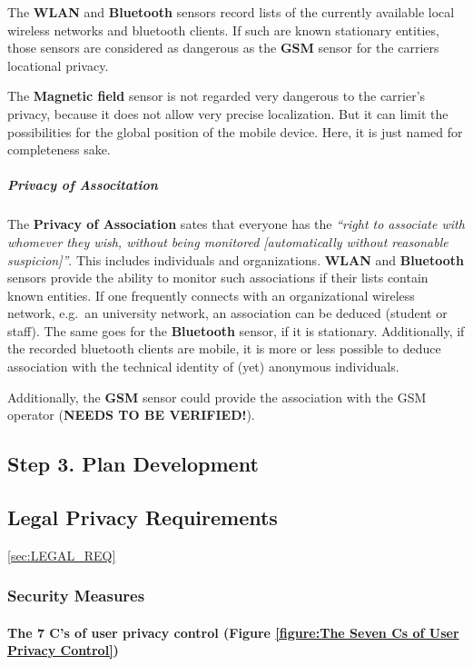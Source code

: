 The \textbf{WLAN} and \textbf{Bluetooth} sensors record lists of the
currently available local wireless networks and bluetooth clients. If
such are known stationary entities, those sensors are considered as
dangerous as the \textbf{GSM} sensor for the carriers locational
privacy.

The \textbf{Magnetic field} sensor is not regarded very dangerous to the
carrier's privacy, because it does not allow very precise localization.
But it can limit the possibilities for the global position of the mobile
device. Here, it is just named for completeness sake.

\subparagraph{Privacy of Associtation}

The \textbf{Privacy of Association} sates that everyone has the
\emph{``right to associate with whomever they wish, without being
monitored [automatically without reasonable suspicion]''}. This
includes individuals and organizations. \textbf{WLAN} and
\textbf{Bluetooth} sensors provide the ability to monitor such
associations if their lists contain known entities. If one frequently
connects with an organizational wireless network, e.g.~an university
network, an association can be deduced (student or staff). The same goes
for the \textbf{Bluetooth} sensor, if it is stationary. Additionally, if
the recorded bluetooth clients are mobile, it is more or less possible
to deduce association with the technical identity of (yet) anonymous
individuals.

Additionally, the \textbf{GSM} sensor could provide the association with
the GSM operator (\textbf{NEEDS TO BE VERIFIED!}).

\subsection{Step 3. Plan Development}

\subsection{Legal Privacy Requirements} \ref{sec:LEGAL_REQ}

\subsubsection{Security Measures}

\paragraph{The 7 C's of user privacy control (Figure \ref{figure:The Seven Cs of User Privacy Control})}

